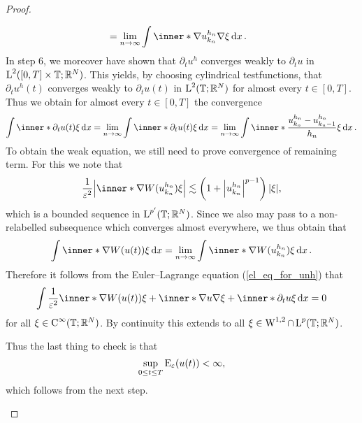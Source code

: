 \begin{proof}
\begin{description}[wide=0pt]
\begin{align*}
		& = 
		\lim_{ n \to \infty }
			\int
				\inner*{ \nabla u_{ k_{ n } }^{ h_{ n } } }{ \nabla \xi }
			\dd{ x }.
	\end{align*}
	In step 6, we moreover have shown that $ \partial_{ t } u^{ h } $ converges weakly to $ \partial_{t } u $ in $ \operatorname{L}^{ 2 } ( [ 0, T ] \times \operatorname{\mathbb{T}} ; \mathbb{ R }^{ N } ) $. This yields, by choosing cylindrical testfunctions, that $ \partial_{ t } u^{ h } ( t ) $ converges weakly to $ \partial_{ t } u ( t ) $ in $ \operatorname{L}^{ 2 } ( \operatorname{\mathbb{T}} ; \mathbb{ R }^{ N } ) $ for almost every $ t \in [ 0 , T ] $.
	Thus we obtain for almost every $ t\in [ 0 , T ] $ the convergence
	\begin{equation*}
		\int
			\inner*{ \partial_{ t } u ( t ) }{ \xi }
		\dd{ x }
		=
		\lim_{ n \to \infty }
			\int
				\inner*{ \partial_{ t } u ( t ) }{ \xi }
			\dd{ x }
		=
		\lim_{ n \to \infty }
			 \int
			 	\inner*{ \frac{ u_{ k_{ n } }^{ h_{ n } } - u_{ k_{ n } - 1 }^{ h_{ n } } }{ h_{ n } } }{ \xi }
			 \dd{ x }.
	\end{equation*}
	To obtain the weak equation, we still need to prove convergence of remaining term. For this we note that 
	\begin{equation*}
		\frac{ 1 }{ \varepsilon^{ 2 } }
		\abs{ \inner*{ \nabla W ( u_{ k_{ n } }^{ h_{ n } } ) }{ \xi } }
		\lesssim
		\left( 1 + \abs{ u_{  k_{ n } }^{ h_{ n } } }^{ p - 1 } \right) \abs{ \xi },
	\end{equation*}
	which is a bounded sequence in $ \operatorname{L}^{ p'} ( \operatorname{\mathbb{T}} ; \mathbb{ R }^{ N } ) $. Since we also may pass to a non-relabelled subsequence which converges almost everywhere, we thus obtain that
	\begin{equation*}
		\int
			\inner*{ \nabla W ( u ( t ) ) }{ \xi } 
		\dd{ x }
		=
		\lim_{ n \to \infty }
			\int
				\inner*{ \nabla W ( u_{ k_{ n } }^{ h_{ n } } ) }{ \xi }
			\dd{ x }.
	\end{equation*}
	Therefore it follows from the Euler--Lagrange equation (\ref{el_eq_for_unh}) that
	\begin{equation*}
		\int
			\frac{ 1 }{ \varepsilon^{ 2 } }
			\inner*{ \nabla W ( u ( t )) }{ \xi }
			+
			\inner*{ \nabla u }{ \nabla \xi }
			+
			\inner*{ \partial_{ t } u }{ \xi }
		\dd{ x }
		=
		0
	\end{equation*}
	for all $ \xi \in \operatorname{C}^{ \infty } ( \operatorname{\mathbb{T}} ; \mathbb{ R }^{ N } ) $. By continuity this extends to all $ \xi \in \operatorname{W}^{ 1 , 2 } \cap \operatorname{L}^{ p } ( \mathbb{ T } ; \mathbb{ R }^{ N } ) $.
	
	Thus the last thing to check is that
	\begin{equation*}
		\sup_{ 0 \leq t \leq T }
			\operatorname{E}_{ \varepsilon } ( u( t ) )
		<
		\infty,
	\end{equation*}
	which follows from the next step.
	

\end{description}
\end{proof}
